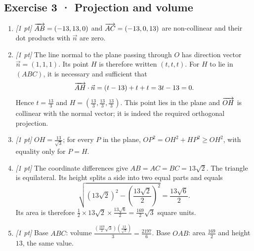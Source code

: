 \subsection*{Exercise 3 · Projection and volume}\begin{enumerate}

\item \textit{[1 pt]} $\overrightarrow{AB}=(-13,13,0)$ and $\overrightarrow{AC}=(-13,0,13)$ are non-collinear and their dot products with $\vec n$ are zero.

\item \textit{[1 pt]} The line normal to the plane passing through $O$ has direction vector $\vec n=(1,1,1)$. Its point $H$ is therefore written $(t,t,t)$. For $H$ to lie in $(ABC)$, it is necessary and sufficient that
\[\overrightarrow{AH}\cdot\vec n=(t-13)+t+t=3t-13=0.\]
Hence $t=\frac{13}{3}$ and $H=(\frac{13}{3},\frac{13}{3},\frac{13}{3})$. This point lies in the plane and $\overrightarrow{OH}$ is collinear with the normal vector; it is indeed the required orthogonal projection.

\item \textit{[1 pt]} $OH=\frac{13}{\sqrt{3}}$; for every $P$ in the plane, $OP^2=OH^2+HP^2\ge OH^2$, with equality only for $P=H$.

\item \textit{[1 pt]} The coordinate differences give $AB=AC=BC=13\sqrt2$. The triangle is equilateral. Its height splits a side into two equal parts and equals
\[\sqrt{(13\sqrt2)^2-(\frac{13\sqrt{2}}{2})^2}=\frac{13\sqrt6}{2}.\]
Its area is therefore $\frac12\times 13\sqrt2\times\frac{13\sqrt6}{2}=\frac{169}{2}\sqrt3$ square units.

\item \textit{[1 pt]} Base $ABC$: volume $\frac{(\frac{169}{2}\sqrt3)(\frac{13}{\sqrt{3}})}{3}=\frac{2197}{6}$. Base $OAB$: area $\frac{169}{2}$ and height $13$, the same value.

\end{enumerate}

